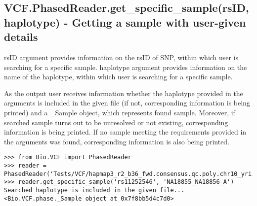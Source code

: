 \subsection{VCF.PhasedReader.get\_specific\_sample(rsID, haplotype) - Getting a sample with user-given details}

\noindent rsID argument provides information on the rsID of SNP, within which user is searching for a specific sample.
haplotype argument provides information on the name of the haplotype, within which user is searching for a specific sample.

\noindent As the output user receives information whether the haplotype provided in the arguments is included in the given file (if not, corresponding information 
is being printed) and a \_Sample object, which represents found sample. Moreover, if searched sample turns out to be unresolved or not existing, corresponding
information is being printed. If no sample meeting the requirements provided in the arguments was found, corresponding information is also being printed.

\begin{verbatim}
>>> from Bio.VCF import PhasedReader
>>> reader = PhasedReader('Tests/VCF/hapmap3_r2_b36_fwd.consensus.qc.poly.chr10_yri.D.phased')
>>> reader.get_specific_sample('rs11252546', 'NA18855_NA18856_A')
Searched haplotype is included in the given file...
<Bio.VCF.phase._Sample object at 0x7f8bb5d4c7d0>

\end{verbatim}
